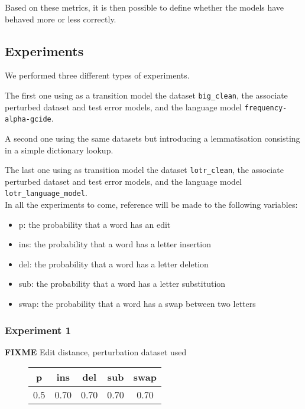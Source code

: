 Based on these metrics, it is then possible to define whether the models have behaved more or less correctly.

\subsection{Experiments}
We performed three different types of experiments.

The first one using as a transition model the dataset \texttt{big\_clean}, the associate perturbed dataset and test error 
models, and the language model \texttt{frequency-alpha-gcide}.

A second one using the same datasets but introducing a lemmatisation consisting in a simple dictionary lookup.

The last one using as transition model the dataset \texttt{lotr\_clean}, the associate perturbed dataset and test error 
models, and the language model \texttt{lotr\_language\_model}.\\

In all the experiments to come, reference will be made to the following variables:
\begin{itemize}
	\item p: the probability that a word has an edit
	\item ins: the probability that a word has a letter insertion
	\item del: the probability that a word has a letter deletion
	\item sub: the probability that a word has a letter substitution
	\item swap: the probability that a word has a swap between two letters
\end{itemize}

\subsubsection{Experiment 1}

\textbf{FIXME}
Edit distance, perturbation dataset used


\begin{figure}[H]
	\centering
	\begin{tabular}{ccccc}
		\toprule
		p 				 & ins 				 	& del  				&  sub 			   &   swap\\ \midrule
		\num{0.5} & \num{0,70} & \num{0,70}  & \num{0,70} & \num{0,70}\\
		\bottomrule
	\end{tabular}
	\label{tab:error_model1}
\end{figure}

